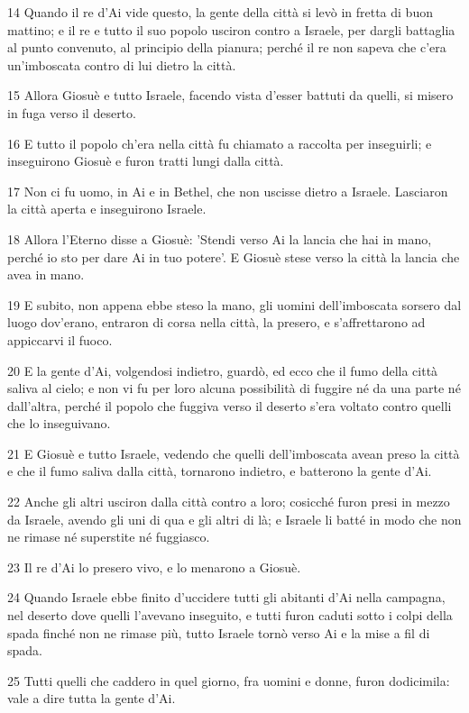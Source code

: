 \par 14 Quando il re d'Ai vide questo, la gente della città si levò in fretta di buon mattino; e il re e tutto il suo popolo usciron contro a Israele, per dargli battaglia al punto convenuto, al principio della pianura; perché il re non sapeva che c'era un'imboscata contro di lui dietro la città.
\par 15 Allora Giosuè e tutto Israele, facendo vista d'esser battuti da quelli, si misero in fuga verso il deserto.
\par 16 E tutto il popolo ch'era nella città fu chiamato a raccolta per inseguirli; e inseguirono Giosuè e furon tratti lungi dalla città.
\par 17 Non ci fu uomo, in Ai e in Bethel, che non uscisse dietro a Israele. Lasciaron la città aperta e inseguirono Israele.
\par 18 Allora l'Eterno disse a Giosuè: 'Stendi verso Ai la lancia che hai in mano, perché io sto per dare Ai in tuo potere'. E Giosuè stese verso la città la lancia che avea in mano.
\par 19 E subito, non appena ebbe steso la mano, gli uomini dell'imboscata sorsero dal luogo dov'erano, entraron di corsa nella città, la presero, e s'affrettarono ad appiccarvi il fuoco.
\par 20 E la gente d'Ai, volgendosi indietro, guardò, ed ecco che il fumo della città saliva al cielo; e non vi fu per loro alcuna possibilità di fuggire né da una parte né dall'altra, perché il popolo che fuggiva verso il deserto s'era voltato contro quelli che lo inseguivano.
\par 21 E Giosuè e tutto Israele, vedendo che quelli dell'imboscata avean preso la città e che il fumo saliva dalla città, tornarono indietro, e batterono la gente d'Ai.
\par 22 Anche gli altri usciron dalla città contro a loro; cosicché furon presi in mezzo da Israele, avendo gli uni di qua e gli altri di là; e Israele li batté in modo che non ne rimase né superstite né fuggiasco.
\par 23 Il re d'Ai lo presero vivo, e lo menarono a Giosuè.
\par 24 Quando Israele ebbe finito d'uccidere tutti gli abitanti d'Ai nella campagna, nel deserto dove quelli l'avevano inseguito, e tutti furon caduti sotto i colpi della spada finché non ne rimase più, tutto Israele tornò verso Ai e la mise a fil di spada.
\par 25 Tutti quelli che caddero in quel giorno, fra uomini e donne, furon dodicimila: vale a dire tutta la gente d'Ai.
